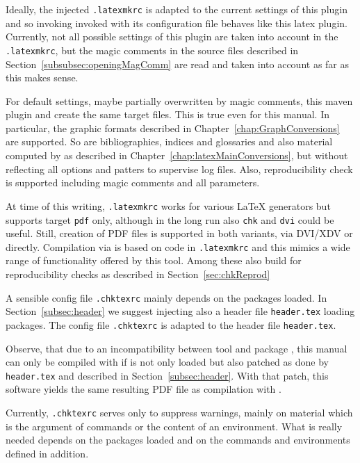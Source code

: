 Ideally, the injected \texttt{.latexmkrc} is adapted to the current settings of this plugin 
and so invoking  invoked with its configuration file 
behaves like this latex plugin. 
Currently, not all possible settings of this plugin 
are taken into account in the \texttt{.latexmkrc}, 
but the magic comments in the source files described in Section~\ref{subsubsec:openingMagComm} 
are read and taken into account as far as this makes sense. 

For default settings, maybe partially overwritten by magic comments, 
this maven plugin and  create the same target files. 
This is true even for this manual. 
In particular, the graphic formats 
described in Chapter~\ref{chap:GraphConversions} are supported. 
So are bibliographies, indices and glossaries and also material computed by  
as described in Chapter~\ref{chap:latexMainConversions}, 
but without reflecting all options and patters to supervise log files. 
Also, reproducibility check is supported including magic comments and all parameters. 

At time of this writing, \texttt{.latexmkrc} works for various \LaTeX{} generators 
but supports target \texttt{pdf} only, 
although in the long run also \texttt{chk} and \texttt{dvi} could be useful. 
Still, creation of PDF files is supported in both variants, via DVI/XDV or directly. 
Compilation via  is based on code in \texttt{.latexmkrc} 
and this mimics a wide range of functionality offered by this tool. 
Among these also build for reproducibility checks as described in Section~\ref{sec:chkReprod}

A sensible config file \texttt{.chktexrc} mainly depends on the packages loaded. 
In Section~\ref{subsec:header} we suggest injecting also a header file \texttt{header.tex} 
loading packages. 
The config file \texttt{.chktexrc} is adapted to the header file \texttt{header.tex}. 

Observe, that due to an incompatibility between tool  and package , 
this manual can only be compiled with  
if  is not only loaded but also patched 
as done by \texttt{header.tex} and described in Section~\ref{subsec:header}. 
With that patch, this software yields the same resulting PDF file 
as compilation with . 

Currently, \texttt{.chktexrc} serves only to suppress warnings, 
mainly on material which is the argument of commands or the content of an environment. 
What is really needed depends on the packages loaded 
and on the commands and environments defined in addition. 

